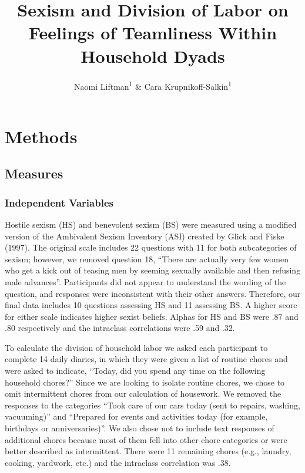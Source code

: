 \documentclass[
  english,
  man,floatsintext]{apa6}
\title{Sexism and Division of Labor on Feelings of Teamliness Within Household Dyads}
\author{Naomi Liftman\textsuperscript{1} \& Cara Krupnikoff-Salkin\textsuperscript{1}}
\date{}
\affiliation{\vspace{0.5cm}\textsuperscript{1} Smith College}
\begin{document}
\maketitle

\hypertarget{methods}{%
\section{Methods}\label{methods}}

\hypertarget{measures}{%
\subsection{Measures}\label{measures}}

\hypertarget{independent-variables}{%
\subsubsection{Independent Variables}\label{independent-variables}}

Hostile sexism (HS) and benevolent sexism (BS) were measured using a modified version of the Ambivalent Sexism Inventory (ASI) created by Glick and Fiske (1997). The original scale includes 22 questions with 11 for both subcategories of sexism; however, we removed question 18, \enquote{There are actually very few women who get a kick out of teasing men by seeming sexually available and then refusing male advances}. Participants did not appear to understand the wording of the question, and responses were inconsistent with their other answers. Therefore, our final data includes 10 questions assessing HS and 11 assessing BS. A higher score for either scale indicates higher sexist beliefs. Alphas for HS and BS were .87 and .80 respectively and the intraclass correlations were .59 and .32.

To calculate the division of household labor we asked each participant to complete 14 daily diaries, in which they were given a list of routine chores and were asked to indicate, \enquote{Today, did you spend any time on the following household chores?} Since we are looking to isolate routine chores, we chose to omit intermittent chores from our calculation of housework. We removed the responses to the categories \enquote{Took care of our cars today (sent to repairs, washing, vacuuming)} and \enquote{Prepared for events and activities today (for example, birthdays or anniversaries)}. We also chose not to include text responses of additional chores because most of them fell into other chore categories or were better described as intermittent. There were 11 remaining chores (e.g., laundry, cooking, yardwork, etc.) and the intraclass correlation was .38.
\end{document}
